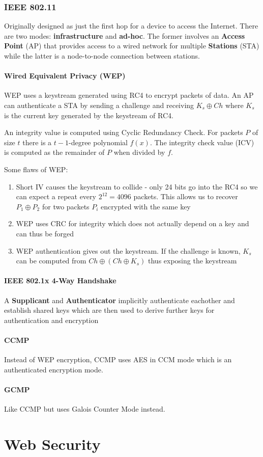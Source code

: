 \documentclass[11pt]{report}
\begin{document}
\subsection{IEEE 802.11}
Originally designed as just the first hop for a device to access the Internet. There are two modes: \textbf{infrastructure} and \textbf{ad-hoc}. The former involves an \textbf{Access Point} (AP) that provides access to a wired network for multiple \textbf{Stations} (STA) while the latter is a node-to-node connection between stations.

\subsubsection{Wired Equivalent Privacy (WEP)}

WEP uses a keystream generated using RC4 to encrypt packets of data. An AP can authenticate a STA by sending a challenge and receiving $K_s \oplus Ch$ where $K_s$ is the current key generated by the keystream of RC4.

An integrity value is computed using Cyclic Redundancy Check. For packets $P$ of size $t$ there is a $t-1$-degree polynomial $f(x)$. The integrity check value (ICV) is computed as the remainder of $P$ when divided by $f$.

Some flaws of WEP:

\begin{enumerate}
	\item Short IV causes the keystream to collide - only 24 bits go into the RC4 so we can expect a repeat every $2^{12} = 4096$ packets. This allows us to recover $P_1 \oplus P_2$ for two packets $P_i$ encrypted with the same key
	\item WEP uses CRC for integrity which does not actually depend on a key and can thus be forged
	\item WEP authentication gives out the keystream. If the challenge is known, $K_s$ can be computed from $Ch \oplus (Ch \oplus K_s)$ thus exposing the keystream
\end{enumerate}

\subsubsection{IEEE 802.1x 4-Way Handshake}
A \textbf{Supplicant} and \textbf{Authenticator} implicitly authenticate eachother and establish shared keys which are then used to derive further keys for authentication and encryption

\subsubsection{CCMP}
Instead of WEP encryption, CCMP uses AES in CCM mode which is an authenticated encryption mode.

\subsubsection{GCMP}
Like CCMP but uses Galois Counter Mode instead.

\chapter{Web Security}
\end{document}
